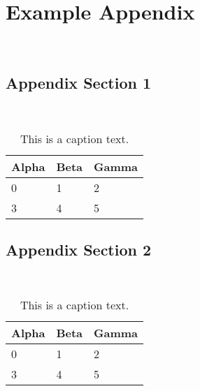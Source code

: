 %
\chapter{Example Appendix}
~\label{sec:appendix}



\section{Appendix Section 1}
~\label{sec:appendix:sec1}



\begin{table}[h]
	\begin{tabularx}{\textwidth}{X | X | X}
		Alpha		& Beta			& Gamma			\\ \hline
		0			& 1				& 2				\\ \hline
		3			& 4				& 5				\\ %
	\end{tabularx}\label{tab:table1}
	\caption{This is a caption text.}
\end{table}

\section{Appendix Section 2}
~\label{sec:appendix:sec2}



\begin{table}[h]
	\begin{tabularx}{\textwidth}{X | X | X}
		Alpha		& Beta			& Gamma			\\ \hline
		0			& 1				& 2				\\ \hline
		3			& 4				& 5				\\ %
	\end{tabularx}\label{tab:table2}
	\caption{This is a caption text.}
\end{table}


